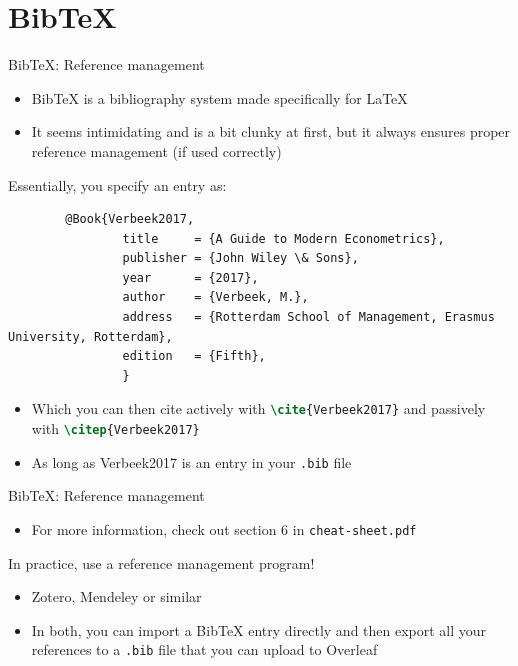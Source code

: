 \documentclass[10pt]{beamer}
\begin{document}
\section*{BibTeX}
\begin{frame}[fragile]{BibTeX: Reference management}
    \begin{itemize}
        \item BibTeX is a bibliography system made specifically for \LaTeX
        \item It seems intimidating and is a bit clunky at first, but it \alert{always} ensures proper reference management (if used correctly)
    \end{itemize}
    Essentially, you specify an entry as:
    \begin{lstlisting}
        @Book{Verbeek2017,
                title     = {A Guide to Modern Econometrics},
                publisher = {John Wiley \& Sons},
                year      = {2017},
                author    = {Verbeek, M.},
                address   = {Rotterdam School of Management, Erasmus University, Rotterdam},
                edition   = {Fifth},
                }
    \end{lstlisting}
    \begin{itemize}
        \item<3-> Which you can then cite actively with \lstinline[language = tex]!\cite{Verbeek2017}! and passively with \lstinline[language = tex]!\citep{Verbeek2017}!
        \item<3-> As long as Verbeek2017 is an entry in your \texttt{.bib} file 
    \end{itemize}
\end{frame}

\begin{frame}[fragile]{BibTeX: Reference management}
\begin{itemize}
    \item For more information, check out \alert{section 6} in \texttt{cheat-sheet.pdf} 
\end{itemize}
 In practice, use a reference management program! 
\begin{itemize}
    \item<2-> Zotero, Mendeley or similar
    \item<3-> In both, you can import a BibTeX entry directly and then \alert{export all your references} to a \texttt{.bib} file that you can upload to Overleaf   
\end{itemize}
\end{frame}
\end{document}
